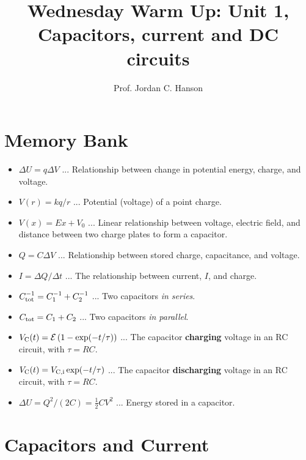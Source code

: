 \documentclass{article}
\begin{document}
\twocolumn

\title{Wednesday Warm Up: Unit 1, Capacitors, current and DC circuits}
\author{Prof. Jordan C. Hanson}

\maketitle

\section{Memory Bank}

\begin{itemize}
\item $\Delta U = q\Delta V$ ... Relationship between change in potential energy, charge, and voltage.
\item $V(r) = k q / r$ ... Potential (voltage) of a point charge.
\item $V(x) = E x + V_0$ ... Linear relationship between voltage, electric field, and distance between two charge plates to form a capacitor.
\item $Q = C\Delta V$ ... Relationship between stored charge, capacitance, and voltage.
\item $I = \Delta Q / \Delta t$ ... The relationship between current, $I$, and charge.
\item $C_{\rm tot}^{-1} = C_1^{-1} + C_2^{-1}$ ... Two capacitors \textit{in series}.
\item $C_{\rm tot} = C_1 + C_2$ ... Two capacitors \textit{in parallel}.
\item $V_{\rm C}(t) = \mathcal{E}\left(1 - \exp(-t/\tau)\right)$ ... The capacitor \textbf{charging} voltage in an RC circuit, with $\tau = RC$.
\item $V_{\rm C}(t) = V_{\rm C,i}\exp(-t/\tau)$ ... The capacitor \textbf{discharging} voltage in an RC circuit, with $\tau = RC$.
\item $\Delta U = Q^2/(2C) = \frac{1}{2}CV^2$ ... Energy stored in a capacitor.
\end{itemize}

\section{Capacitors and Current}
\end{document}
